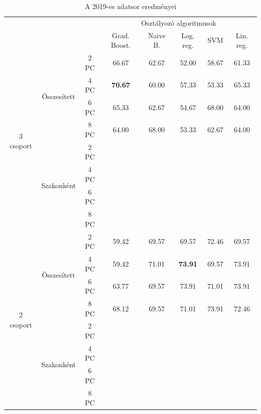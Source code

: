 \documentclass[12pt]{article}
\begin{document}
\begin{table}[H]
\centering
\begin{tabular}{ccc|ccccc}

    &&&\multicolumn{5}{c}{Osztályozó algoritmusok} \\
    &&& Grad. Boost. &  Naive B. & Log. reg.  &  SVM & Lin. reg. \\ 
        \hline
    \multirow{8}{*}{3 csoport}& \multirow{4}{*}{Összesített}&2 PC&66.67&62.67&52.00&58.67&61.33 \\
    												&&4 PC&\textbf{70.67}&60.00&57.33&53.33&65.33\\
    												&&6 PC&65.33&62.67&54.67&68.00&64.00\\
    												&&8 PC&64.00&68.00&53.33&62.67&64.00\\\cline{3-8}%
    						& \multirow{4}{*}{Szakonként}&2 PC&&&&& \\
    												&&4 PC&&&&&\\
    												&&6 PC&&&&&\\
    												&&8 PC&&&&&\\
    						 
    \hline
    \hline
    \multirow{8}{*}{2 csoport}& \multirow{4}{*}{Összesített}&2 PC&59.42&69.57&69.57&72.46&69.57\\
    												&&4 PC&59.42&71.01&\textbf{73.91}&69.57&73.91\\
    												&&6 PC&63.77&69.57&73.91&71.01&73.91\\
    												&&8 PC&68.12&69.57&71.01&73.91&72.46\\\cline{3-8}
    						 & \multirow{4}{*}{Szakonként}&2 PC&&&&&\\
    												&&4 PC&&&&&\\
    												&&6 PC&&&&&\\
    												&&8 PC&&&&&\\
    												\hline
\end{tabular}
\caption{A 2019-es adatsor eredményei}
\label{tab:multicol}
\end{table}
\end{document}
